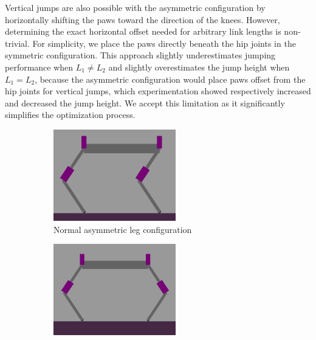 Vertical jumps are also possible with the asymmetric configuration by horizontally shifting the paws toward the direction of the knees. However, determining the exact horizontal offset needed for arbitrary link lengths is non-trivial. For simplicity, we place the paws directly beneath the hip joints in the symmetric configuration. This approach slightly underestimates jumping performance when \(L_1 \neq L_2\) and slightly overestimates the jump height when \(L_1 = L_2\), because the asymmetric configuration would place paws offset from the hip joints for vertical jumps, which experimentation showed respectively increased and decreased the jump height. We accept this limitation as it significantly simplifies the optimization process.


\begin{figure}[h]
    \centering
    \begin{subfigure}[b]{0.48\textwidth}
        \centering
        \includegraphics[width=\textwidth]{Images/link_length_optimization/asymmetric_legs.png}
        \caption{Normal asymmetric leg configuration}
    \end{subfigure}
    \hfill
    \begin{subfigure}[b]{0.48\textwidth}
        \centering
        \includegraphics[width=\textwidth]{Images/link_length_optimization/symmetric_legs.png}

\end{subfigure}
\end{figure}
